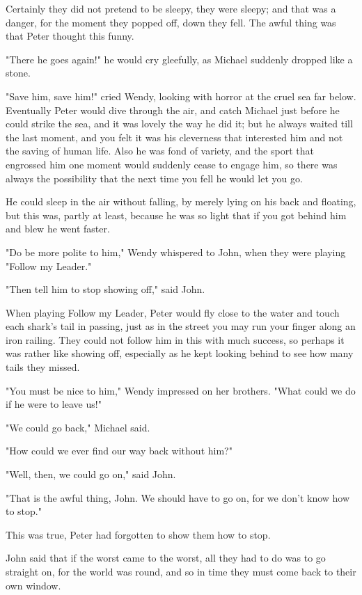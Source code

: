 Certainly they did not pretend to be sleepy, they were sleepy; and that
was a danger, for the moment they popped off, down they fell. The awful
thing was that Peter thought this funny.


"There he goes again!" he would cry gleefully, as Michael suddenly dropped
like a stone.


"Save him, save him!" cried Wendy, looking with horror at the cruel sea
far below. Eventually Peter would dive through the air, and catch Michael
just before he could strike the sea, and it was lovely the way he did it;
but he always waited till the last moment, and you felt it was his
cleverness that interested him and not the saving of human life. Also he
was fond of variety, and the sport that engrossed him one moment would
suddenly cease to engage him, so there was always the possibility that the
next time you fell he would let you go.


He could sleep in the air without falling, by merely lying on his back and
floating, but this was, partly at least, because he was so light that if
you got behind him and blew he went faster.


"Do be more polite to him," Wendy whispered to John, when they were
playing "Follow my Leader."


"Then tell him to stop showing off," said John.


When playing Follow my Leader, Peter would fly close to the water and
touch each shark's tail in passing, just as in the street you may run your
finger along an iron railing. They could not follow him in this with much
success, so perhaps it was rather like showing off, especially as he kept
looking behind to see how many tails they missed.


"You must be nice to him," Wendy impressed on her brothers. "What could we
do if he were to leave us!"


"We could go back," Michael said.


"How could we ever find our way back without him?"


"Well, then, we could go on," said John.


"That is the awful thing, John. We should have to go on, for we don't know
how to stop."


This was true, Peter had forgotten to show them how to stop.


John said that if the worst came to the worst, all they had to do was to
go straight on, for the world was round, and so in time they must come
back to their own window.


